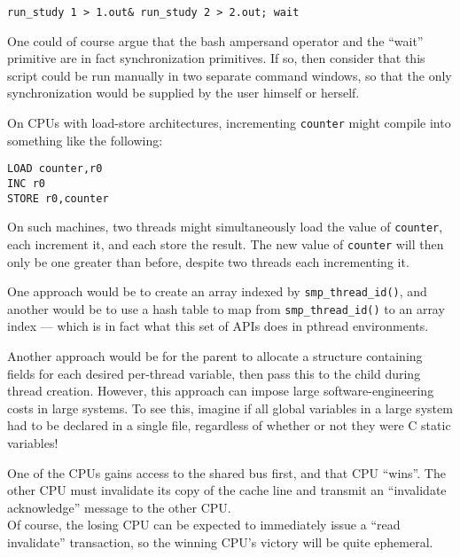	   { \scriptsize \tt run\_study 1 > 1.out\& run\_study 2 > 2.out; wait}

	   One could of course argue that the bash ampersand operator and
	   the ``wait'' primitive are in fact synchronization primitives.
	   If so, then consider that 
	   this script could be run manually in two separate
	   command windows, so that the only synchronization would be
	   supplied by the user himself or herself.


	On CPUs with load-store architectures, incrementing {\tt counter}
	might compile into something like the following:

\vspace{5pt}
\begin{minipage}[t]{\columnwidth}
\small 
\begin{verbatim}
LOAD counter,r0
INC r0
STORE r0,counter
\end{verbatim}
\end{minipage} 
\vspace{5pt}

	On such machines, two threads might simultaneously load the
	value of {\tt counter}, each increment it, and each store the
	result.
	The new value of {\tt counter} will then only be one greater
	than before, despite two threads each incrementing it.


	One approach would be to create an array indexed by
	{\tt smp\_thread\_id()}, and another would be to use a hash
	table to map from {\tt smp\_thread\_id()} to an array
	index --- which is in fact what this
	set of APIs does in pthread environments.

	Another approach would be for the parent to allocate a structure
	containing fields for each desired per-thread variable, then
	pass this to the child during thread creation.
	However, this approach can impose large software-engineering
	costs in large systems.
	To see this, imagine if all global variables in a large system
	had to be declared in a single file, regardless of whether or
	not they were C static variables!

One of the CPUs gains access
to the shared bus first,
and that CPU ``wins''.  The other CPU must invalidate its copy of the
cache line and transmit an ``invalidate acknowledge'' message
to the other CPU. \\
Of course, the losing CPU can be expected to immediately issue a
``read invalidate'' transaction, so the winning CPU's victory will
be quite ephemeral.

